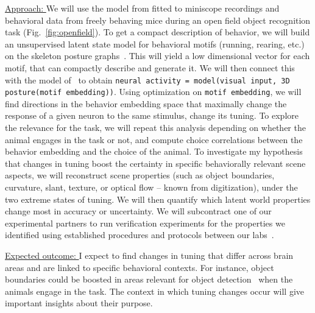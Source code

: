 \documentclass[COG,11pt]{ercgrant}
\begin{document}
\underline{Approach: } 
We will use the model from  fitted to miniscope recordings and behavioral data from freely behaving mice during an open field object recognition task (Fig.~\ref{fig:openfield}).
To get a compact description of behavior, we will build an unsupervised latent state model for behavioral motifs (running, rearing, etc.) on the skeleton posture graphs~\parencite[similar to][]{Wiltschko2015-ey, Wiltschko2020-zd}.
This will yield a low dimensional vector for each motif, that can compactly describe and generate it.%
We will then connect this with the model of~ to obtain \texttt{neural activity = model(visual input, 3D posture(motif embedding))}. 
Using optimization on \texttt{motif embedding}, we will find directions in the behavior embedding space that maximally change the response of a given neuron to the same stimulus, \ie change its tuning.
To explore the relevance for the task, we will repeat this analysis depending on whether the animal engages in the task or not, and compute choice correlations between the behavior embedding and the choice of the animal.
To investigate my hypothesis that changes in tuning boost the certainty in specific behaviorally relevant scene aspects, we will reconstruct scene properties (such as object boundaries, curvature, slant, texture, or optical flow -- known from digitization), under the two extreme states of tuning. 
We will then quantify which latent world properties change most in accuracy or uncertainty.
We will subcontract one of our experimental partners to run verification experiments for the properties we identified using established procedures and protocols between our labs~\parencite[used in \eg][]{Walker2019-yw, Franke2022-do}.

\underline{Expected outcome: } I expect to find changes in tuning that differ across brain areas and are linked to specific behavioral contexts. 
For instance, object boundaries could be boosted in areas relevant for object detection~\parencite{Froudarakis2019-yt} when the animals engage in the task.
The context in which tuning changes occur will give important insights about their purpose.
\end{document}

